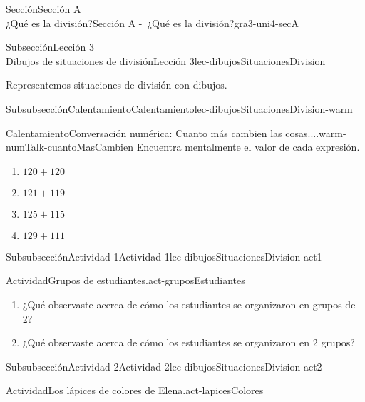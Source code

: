 \begin{sectionptx}{Sección}{{\Large Sección A\\}¿Qué es la división?}{}{Sección A -~¿Qué es la división?}{}{}{gra3-uni4-secA}
\begin{subsectionptx}{Subsección}{{\normalsize Lección 3\\[-0.05cm]}Dibujos de situaciones de división}{}{Lección 3}{}{}{lec-dibujosSituacionesDivision}
\begin{introduction}{}%
Representemos situaciones de división con dibujos.%
\end{introduction}%
%
%
\typeout{************************************************}
\typeout{************************************************}
%
\begin{subsubsectionptx}{Subsubsección}{Calentamiento}{}{Calentamiento}{}{}{lec-dibujosSituacionesDivision-warm}
\begin{exploration}{Calentamiento}{Conversación numérica: Cuanto más cambien las cosas....}{warm-numTalk-cuantoMasCambien}%
Encuentra mentalmente el valor de cada expresión.%
\par
%
\begin{enumerate}[label={\Alph*.}]
\item{}\(\displaystyle 120 + 120\)%
\item{}\(\displaystyle 121 + 119\)%
\item{}\(\displaystyle 125 + 115\)%
\item{}\(\displaystyle 129 + 111\)%
\end{enumerate}
%
\end{exploration}%
\end{subsubsectionptx}
%
%
\typeout{************************************************}
\typeout{************************************************}
%
\begin{subsubsectionptx}{Subsubsección}{Actividad 1}{}{Actividad 1}{}{}{lec-dibujosSituacionesDivision-act1}
\begin{activity}{Actividad}{Grupos de estudiantes.}{act-gruposEstudiantes}%
%
\begin{enumerate}
\item{}¿Qué observaste acerca de cómo los estudiantes se organizaron en grupos de 2?%
\item{}¿Qué observaste acerca de cómo los estudiantes se organizaron en 2 grupos?%
\end{enumerate}
%
\end{activity}%
\end{subsubsectionptx}
%
%
\typeout{************************************************}
\typeout{************************************************}
%
\begin{subsubsectionptx}{Subsubsección}{Actividad 2}{}{Actividad 2}{}{}{lec-dibujosSituacionesDivision-act2}
\begin{activity}{Actividad}{Los lápices de colores de Elena.}{act-lapicesColores}%

\end{activity}
\end{subsubsectionptx}
\end{subsectionptx}
\end{sectionptx}

